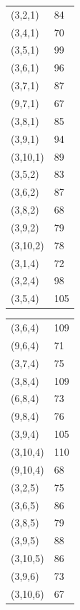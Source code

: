 \documentclass[11pt]{article}
\begin{document}
\begin{minipage}{.3\textwidth}
\begin{tabular}{ll}
(3,2,1) & 84 \\
(3,4,1) & 70 \\
(3,5,1) & 99 \\
(3,6,1) & 96 \\
(3,7,1) & 87 \\
(9,7,1) & 67 \\
(3,8,1) & 85 \\
(3,9,1) & 94 \\
(3,10,1) & 89 \\
(3,5,2) & 83 \\
(3,6,2) & 87 \\
(3,8,2) & 68 \\
(3,9,2) & 79 \\
(3,10,2) & 78 \\
(3,1,4) & 72 \\
(3,2,4) & 98 \\
(3,5,4) & 105 \\
\end{tabular}
\end{minipage}
\begin{minipage}{.3\textwidth}
\begin{tabular}{ll}
(3,6,4) & 109 \\
(9,6,4) & 71 \\
(3,7,4) & 75 \\
(3,8,4) & 109 \\
(6,8,4) & 73 \\
(9,8,4) & 76 \\
(3,9,4) & 105 \\
(3,10,4) & 110 \\
(9,10,4) & 68 \\
(3,2,5) & 75 \\
(3,6,5) & 86 \\
(3,8,5) & 79 \\
(3,9,5) & 88 \\
(3,10,5) & 86 \\
(3,9,6) & 73 \\
(3,10,6) & 67 \\
\end{tabular}
\end{minipage}
\end{document}
